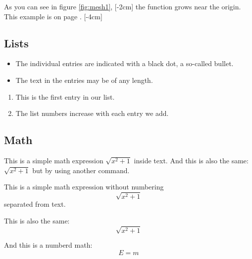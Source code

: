 \documentclass[12pt, letterpaper]{article}
\begin{document}
As you can see in figure \ref{fig:mesh1},
[-2cm]
the function grows near the origin. 
This example is on page \pageref{fig:mesh1}.
\reversemarginpar{}[-4cm]



\subsection{Lists}

\begin{itemize}
    \item The individual entries are indicated with a black dot, a so-called bullet.
    \item The text in the entries may be of any length.
\end{itemize}
  
\begin{enumerate}
    \item This is the first entry in our list.
    \item The list numbers increase with each entry we add.
\end{enumerate}

\subsection{Math}

This is a simple math expression \(\sqrt{x^2+1}\) inside text. 
And this is also the same: 
\begin{math}
\sqrt{x^2+1}
\end{math}
but by using another command.

This is a simple math expression without numbering
\[\sqrt{x^2+1}\] 
separated from text.

This is also the same:
\begin{displaymath}
\sqrt{x^2+1}
\end{displaymath}

And this is a numberd math: 
\begin{equation}
E=m
\end{equation}
\end{document}

